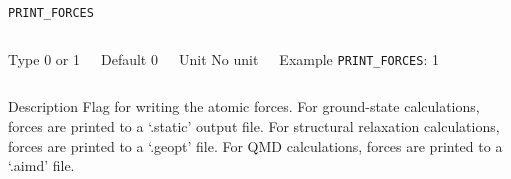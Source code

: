 \begin{frame}[allowframebreaks]{\texttt{PRINT\_FORCES}} \label{PRINT_FORCES}
\vspace*{-12pt}
\begin{columns}
\begin{block}{Type}
0 or 1
\end{block}

\begin{block}{Default}
0
\end{block}

\begin{block}{Unit}
No unit
\end{block}

\begin{block}{Example}
\texttt{PRINT\_FORCES}: 1
\end{block}
\end{columns}

\begin{block}{Description}
Flag for writing the atomic forces. For ground-state calculations, forces are printed to a `.static' output file. For structural relaxation calculations, forces are printed to a `.geopt' file. For QMD calculations, forces are printed to a `.aimd' file.
\end{block}

\end{frame}




